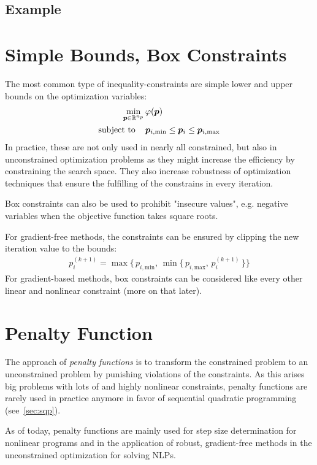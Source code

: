 		\subsection{Example} %

	\section{Simple Bounds, Box Constraints}
		The most common type of inequality-constraints are simple lower and upper bounds on the optimization variables:
		\begin{align*}
			\min_{\bm{p} \in \mathbb{R}^{n_p}} &\, \varphi(\bm{p}) \\
			\mathrm{subject~to}\quad &\,
				\bm{p}_{i, \mathrm{min}} \leq \bm{p}_i \leq \bm{p}_{i, \mathrm{max}}
		\end{align*}
		In practice, these are not only used in nearly all constrained, but also in unconstrained optimization problems as they might increase the efficiency by constraining the search space. They also increase robustness of optimization techniques that ensure the fulfilling of the constrains in every iteration.

		Box constraints can also be used to prohibit "insecure values", e.g. negative variables when the objective function takes square roots.

		For gradient-free methods, the constraints can be ensured by clipping the new iteration value to the bounds:
		\begin{align*}
			p_i^{(k + 1)} = \max\big\{\, p_{i, \mathrm{min}},\, \min\big\{\, p_{i, \mathrm{max}},\, p_i^{(k + 1)} \,\big\} \big\}
		\end{align*}
		For gradient-based methods, box constraints can be considered like every other linear and nonlinear constraint (more on that later).

	\section{Penalty Function}
		The approach of \emph{penalty functions} is to transform the constrained problem to an unconstrained problem by punishing violations of the constraints. As this arises big problems with lots of and highly nonlinear constraints, penalty functions are rarely used in practice anymore in favor of sequential quadratic programming (see~\autoref{sec:sqp}).

		As of today, penalty functions are mainly used for step size determination for nonlinear programs and in the application of robust, gradient-free methods in the unconstrained optimization for solving NLPs.

